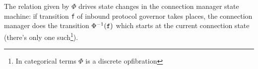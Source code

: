 \noindent The relation given by \(\Phi\) drives state changes in the connection manager
state machine: if transition \texttt{f} of inbound protocol governor takes
places, the connection manager does the transition
\(\Phi^{-1}(\text{\texttt{f}})\) which starts at the current connection state
(there's only one such\footnote{In categorical terms \(\Phi\) is a discrete
opfibration}).
